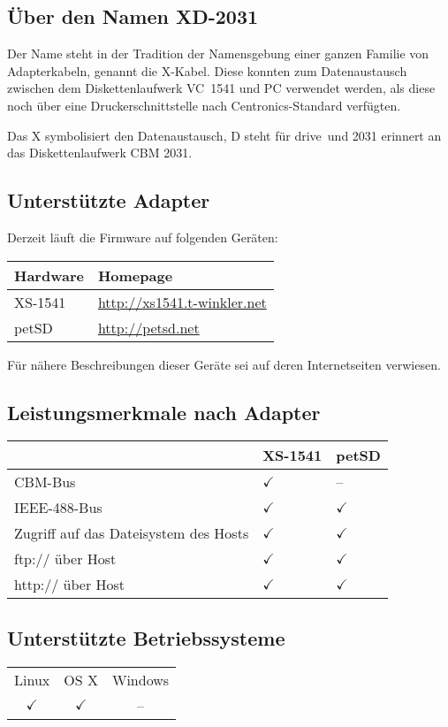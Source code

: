 \documentclass[10pt,a4paper]{scrartcl}		%
\begin{document}
\subsection{Über den Namen \glqq XD-2031\grqq}
Der Name steht in der Tradition der Namensgebung einer ganzen Familie
von Adapterkabeln, genannt die X-Kabel. Diese konnten zum 
Datenaustausch zwischen dem Diskettenlaufwerk \mbox{VC 1541} 
und PC verwendet werden, als diese noch über eine
Druckerschnittstelle nach Centronics-Standard verfügten.

Das X symbolisiert den Datenaustausch, D steht für \glqq drive\grqq\ 
und 2031 erinnert an das Diskettenlaufwerk CBM 2031.

\subsection{Unterstützte Adapter}
Derzeit läuft die Firmware auf folgenden Geräten:

\begin{tabular}[c]{l l}
\toprule 
Hardware & Homepage \\
\midrule
XS-1541	& \url{http://xs1541.t-winkler.net} \\
petSD	& \url{http://petsd.net} \\
\bottomrule
\end{tabular}

Für nähere Beschreibungen dieser Geräte sei auf deren Internetseiten
verwiesen.

\subsection*{Leistungsmerkmale nach Adapter}

\begin{tabular}[c]{l l l}
\toprule
			& XS-1541	& petSD			\\
\midrule
CBM-Bus			& $\checkmark$	& -- 			\\
IEEE-488-Bus		& $\checkmark$	& $\checkmark$		\\
Zugriff auf das Dateisystem
des Hosts		& $\checkmark$	& $\checkmark$		\\
ftp:// über Host	& $\checkmark$	& $\checkmark$		\\
http:// über Host	& $\checkmark$	& $\checkmark$		\\
\bottomrule
\end{tabular}

\subsection{Unterstützte Betriebssysteme}
\begin{tabular}[c]{c c c}
\toprule
Linux & OS X & Windows \\
$\checkmark$ & $\checkmark$ & -- \\
\bottomrule
\end{tabular}
\end{document}
